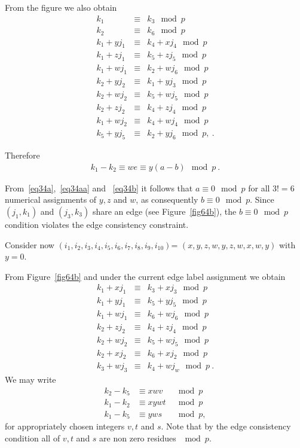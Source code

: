 { From the figure we also obtain
\begin{equation}\label{eq33c}\begin{array}{cccc}
k_1 & \equiv & k_3 \mod p\\
k_2 & \equiv & k_6 \mod p\\
k_1+yj_1 & \equiv & k_4+xj_4 \mod p\\
k_1+zj_1 & \equiv & k_5+zj_5 \mod p\\
k_1+wj_1 & \equiv & k_2+wj_6 \mod p\\
k_2+yj_2 & \equiv & k_1+yj_3 \mod p\\
k_2+wj_2 & \equiv & k_5+wj_5 \mod p\\
k_2+zj_2 & \equiv & k_4+zj_4 \mod p\\
k_1+wj_2 & \equiv & k_4+wj_4 \mod p\\
k_5+yj_5 & \equiv & k_2+yj_6 \mod p,~.
\end{array}\end{equation}

Therefore
\begin{eqnarray}\label{eq34b}
k_1 -k_2 \equiv we \equiv y(a-b) \mod p~.
\end{eqnarray}

From~\eqref{eq34a},~\eqref{eq34aa} and ~\eqref{eq34b} it follows
that $a \equiv 0 \mod p$ for all $3!=6$ numerical assignments of
$y,z$ and $w$, as consequently $b \equiv 0 \mod p$. Since
$(j_1,k_1)$ and $(j_3,k_3)$ share an edge (see
Figure~\ref{fig64b}), the $b \equiv 0 \mod p$ condition violates
the edge consistency constraint.



 Consider now
$(i_1,i_2,i_3,i_4,i_5,i_6,i_7,i_8,i_9,i_{10})$=
$(x,y,z,w,y,z,w,x,w,y)$ with $y=0$.


 From Figure~\ref{fig64b} and under the current edge label
 assignment we obtain
\begin{equation}\label{eq11a}\begin{array}{cccc}
k_1+xj_1 & \equiv & k_3+xj_3 \mod p\\
k_1+yj_1 & \equiv & k_5+yj_5 \mod p\\
k_1+wj_1 & \equiv & k_6+wj_6 \mod p\\
k_2+zj_2 & \equiv & k_4+zj_4 \mod p\\
k_2+wj_2 & \equiv & k_5+wj_5 \mod p\\
k_2+xj_2 & \equiv & k_6+xj_2 \mod p\\
k_3+wj_3 & \equiv & k_4+wj_w \mod p~.
\end{array}\end{equation}
We may write
\begin{equation}\label{eq11b}\begin{array}{cccc}
k_2-k_5 &\equiv xwv &\mod p \\
k_1-k_2 &\equiv xywt &\mod p\\
k_1-k_5 &\equiv yws &\mod p,
\end{array}\end{equation}
for appropriately chosen integers $v,t$ and $s$. Note that by the
edge consistency condition all of $v,t$ and $s$ are non zero
residues $\mod p$.


}
